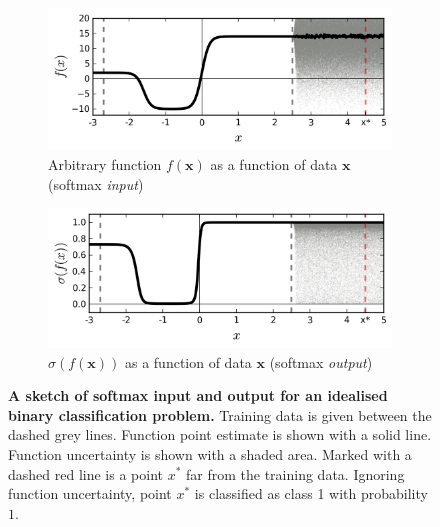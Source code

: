 \documentclass{article}
\newcommand{\x}{\mathbf{x}}
\theoremstyle{definition}
\begin{document}
\begin{figure}[t]
\vspace{-2mm}
	\centering
	\begin{subfigure}[b]{0.49\textwidth}
		\includegraphics[width=\linewidth, trim=2mm 3mm 2mm 2mm, clip]{figs/exp2/sketch_classification}
		\vspace{-4mm}
		\caption{Arbitrary function $f(\x)$ as a function of data $\x$ (softmax \textit{input})} \label{fig:class_sketch_input}
	\end{subfigure}%
	\hspace{2mm}
	\begin{subfigure}[b]{0.49\textwidth}
		\vspace{1mm}
		\includegraphics[width=\linewidth, trim=2mm 3mm 2mm 2mm, clip]{figs/exp2/sketch_classification_prob}
		\vspace{-4mm}
		\caption{$\sigma(f(\x))$ as a function of data $\x$ (softmax \textit{output})} \label{fig:class_sketch_output}
	\end{subfigure}
	\vspace{-8mm}
	\caption{\textbf{A sketch of softmax input and output for an idealised binary classification problem.} Training data is given between the dashed grey lines. Function point estimate is shown with a solid line. Function uncertainty is shown with a shaded area. Marked with a dashed red line is a point $x^*$ far from the training data. Ignoring function uncertainty, point $x^*$ is classified as class 1 with probability $1$.} \label{fig:class_sketch}
\vspace{-4mm}
\end{figure}
\end{document}
